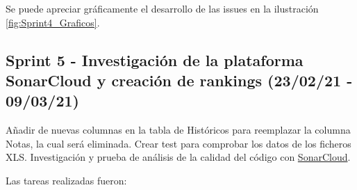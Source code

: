 Se puede apreciar gráficamente el desarrollo de las issues en la ilustración \ref{fig:Sprint4_Graficos}.


\subsection{Sprint 5 - Investigación de la plataforma SonarCloud y creación de rankings (23/02/21 - 09/03/21)}
Añadir de nuevas columnas en la tabla de Históricos para reemplazar la columna Notas, la cual será eliminada. Crear test para comprobar los datos de los ficheros XLS. Investigación y prueba de análisis de la calidad del código con \href{https://sonarcloud.io/}{SonarCloud}.

Las tareas realizadas fueron:
